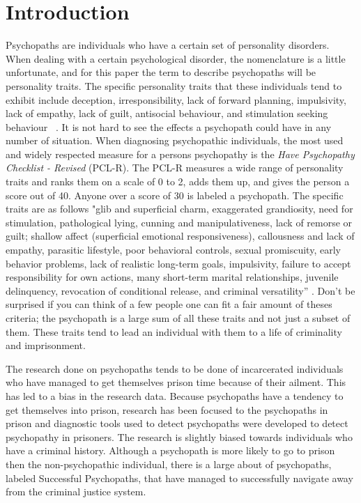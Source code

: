 \documentclass[12pt,jou]{apa}
\begin{document}


\tableofcontents                  
\newpage
{}
\pagestyle{fancy}
\fancyhf{}
\fancyhead[R]{\thepage}

\section{Introduction}
Psychopaths are individuals who have a certain set of personality disorders. When dealing with a certain psychological disorder, the nomenclature is a little unfortunate, and for this paper the term to describe psychopaths will be personality traits. The specific personality traits that these individuals tend to exhibit include deception, irresponsibility, lack of forward planning, impulsivity, lack of empathy, lack of guilt, antisocial behaviour, and stimulation seeking behaviour ~\cite{brazil}. It is not hard to see the effects a psychopath could have in any number of situation. When diagnosing psychopathic individuals, the most used and widely respected measure for a persons psychopathy is the \textit{Have Psychopathy Checklist - Revised }(PCL-R)\cite{nickerson2014}. The PCL-R measures a wide range of personality traits and ranks them on a scale of 0 to 2, adds them up, and gives the person a score out of 40. Anyone over a score of 30 is labeled a psychopath. The specific traits are as follows "glib and superficial charm, exaggerated grandiosity, need for stimulation, pathological lying, cunning and manipulativeness, lack of remorse or guilt; shallow affect (superficial emotional responsiveness), callousness and lack of empathy, parasitic lifestyle, poor behavioral controls, sexual promiscuity, early behavior problems, lack of realistic long-term goals, impulsivity, failure to accept responsibility for own actions, many short-term marital relationships, juvenile delinquency, revocation of conditional release, and criminal versatility” \cite{hareharpur1991}. Don't be surprised if you can think of a few people one can fit a fair amount of theses criteria; the psychopath is a large sum of all these traits and not just a subset of them. These traits tend to lead an individual with them to a life of criminality and imprisonment. 

The research done on psychopaths tends to be done of incarcerated individuals who have managed to get themselves prison time because of their ailment. This has led to a bias in the research data. Because psychopaths have a tendency to get themselves into prison, research has been focused to the psychopaths in prison and diagnostic tools used to detect psychopaths were developed to detect psychopathy in prisoners. The research is slightly biased towards individuals who have a criminal history. Although a psychopath is more likely to go to prison then the non-psychopathic individual, there is a large about of psychopaths, labeled Successful Psychopaths, that have managed to successfully navigate away from the criminal justice system.  
\newpage


\end{document}
